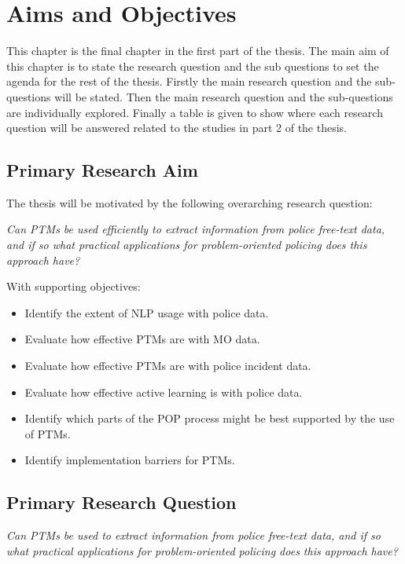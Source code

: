 \chapter{Aims and Objectives} This chapter is the final chapter in the first part of the thesis. The main aim of this chapter is to state the research question and the sub questions to set the agenda for the rest of the thesis. Firstly the main research question and the sub-questions will be stated. Then the main research question and the sub-questions are individually explored. Finally a table is given to show where each research question will be answered related to the studies in part 2 of the thesis.

\section{Primary Research Aim}
The thesis will be motivated by the following overarching research question: 

\emph{Can PTMs be used efficiently to extract information from police free-text data, and if so what practical applications for problem-oriented policing does this approach have?}

With supporting objectives:
\begin{itemize}
\item Identify the extent of NLP usage with police data.

\item Evaluate how effective PTMs are with MO data.

\item Evaluate how effective PTMs are with police incident data.

\item Evaluate how effective active learning is with police data.

\item Identify which parts of the POP process might be best supported by the use of PTMs.

\item Identify implementation barriers for PTMs.

\end{itemize}

\section{Primary Research Question}

\emph{Can PTMs be used to extract information from police free-text data, and if so what practical applications for problem-oriented policing does this approach have?}

